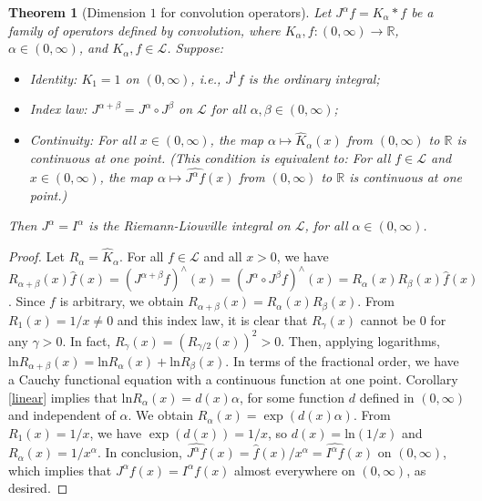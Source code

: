 \documentclass[12pt,reqno]{amsart}
\theoremstyle{plain}
\newtheorem{theorem}{Theorem}[section] %
\numberwithin{equation}{section} %
\begin{document}
\begin{theorem}[Dimension $1$ for convolution operators] \label{th1}
Let $J^\alpha f=K_\alpha\ast f$ be a family of operators defined by convolution, where $K_\alpha,f:(0,\infty)\rightarrow\mathbb{R}$, $\alpha\in (0,\infty)$, and $K_\alpha,f\in\mathcal{L}$. Suppose: 
\begin{itemize}
\item Identity: $K_1=1$ on $(0,\infty)$, i.e., $J^1 f$ is the ordinary integral;
\item Index law: $J^{\alpha+\beta}=J^\alpha\circ J^\beta$ on $\mathcal{L}$ for all $\alpha,\beta\in (0,\infty)$; 
\item Continuity: For all $x\in (0,\infty)$, the map $\alpha\mapsto \widehat{K}_\alpha(x)$ from $(0,\infty)$ to $\mathbb{R}$ is continuous at one point. (This condition is equivalent to: For all $f\in\mathcal{L}$ and $x\in (0,\infty)$, the map $\alpha\mapsto \widehat{J^{\alpha}f}(x)$ from $(0,\infty)$ to $\mathbb{R}$ is continuous at one point.)
\end{itemize}
Then $J^\alpha=I^\alpha$ is the Riemann-Liouville integral on $\mathcal{L}$, for all $\alpha\in (0,\infty)$.
\end{theorem}
\begin{proof}
Let $R_\alpha=\widehat{K}_\alpha$. For all $f\in\mathcal{L}$ and all $x>0$, we have $R_{\alpha+\beta}(x)\widehat{f}(x)=(J^{\alpha+\beta}f)^\wedge(x)=(J^\alpha\circ J^\beta f)^\wedge(x)=R_\alpha(x)R_\beta(x)\widehat{f}(x)$. Since $f$ is arbitrary, we obtain $R_{\alpha+\beta}(x)=R_\alpha(x)R_\beta(x)$. From $R_1(x)=1/x\neq0$ and this index law, it is clear that $R_\gamma(x)$ cannot be $0$ for any $\gamma>0$. In fact, $R_\gamma(x)=(R_{\gamma/2}(x))^2>0$. Then, applying logarithms, $\mathrm{ln}R_{\alpha+\beta}(x)=\mathrm{ln}R_\alpha(x)+\mathrm{ln}R_\beta(x)$. In terms of the fractional order, we have a Cauchy functional equation with a continuous function at one point. Corollary \ref{linear} implies that $\mathrm{ln}R_\alpha(x)=d(x)\alpha$, for some function $d$ defined in $(0,\infty)$ and independent of $\alpha$. We obtain $R_\alpha(x)=\exp(d(x)\alpha)$. From $R_1(x)=1/x$, we have $\exp(d(x))=1/x$, so $d(x)=\mathrm{ln}(1/x)$ and $R_\alpha(x)=1/x^\alpha$. In conclusion, $\widehat{J^\alpha f}(x)=\widehat{f}(x)/x^\alpha=\widehat{I^\alpha f}(x)$ on $(0,\infty)$, which implies that $J^\alpha f(x)=I^\alpha f(x)$ almost everywhere on $(0,\infty)$, as desired.
\end{proof}
\end{document}
